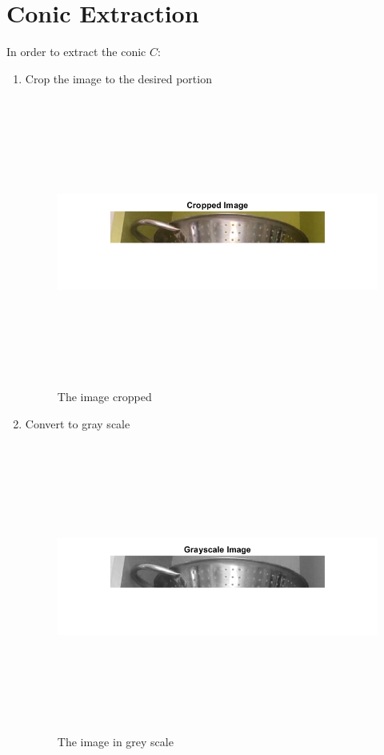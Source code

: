 \section{Conic Extraction}
In order to extract the conic $C$:
\begin{enumerate}
    \item Crop the image to the desired portion
    \begin{figure}[H]
    \centering
    \includegraphics[height=9.5cm, width=\textwidth, keepaspectratio]{Report/Images/Features/Conic/CroppedImage.png}
    \caption{\label{fig:conic:cropped image}The image cropped}
    \end{figure}

    \item Convert to gray scale
    \begin{figure}[H]
    \centering
    \includegraphics[height=9.5cm, width=\textwidth, keepaspectratio]{Report/Images/Features/Conic/GrayscaleImage.png}
    \caption{\label{fig:conic:gray scale}The image in grey scale}
    \end{figure}


\end{enumerate}
